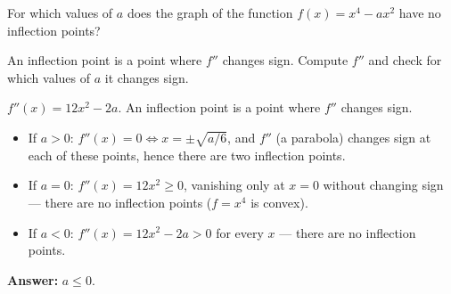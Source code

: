 
\begin{question}
For which values of $a$ does the graph of the function $f(x)=x^4-ax^2$ have no inflection points?
\end{question}

\begin{hint}
An inflection point is a point where $f''$ changes sign. Compute $f''$ and check for which values of $a$ it changes sign.
\end{hint}

\begin{solution}
$f''(x)=12x^2-2a$. An inflection point is a point where $f''$ changes sign.
\begin{itemize}
  \item If $a>0$: $f''(x)=0\iff x=\pm\sqrt{a/6}$, and $f''$ (a parabola) changes sign at each of these points, hence there are two inflection points.
  \item If $a=0$: $f''(x)=12x^2\ge0$, vanishing only at $x=0$ without changing sign — there are no inflection points ($f=x^4$ is convex).
  \item If $a<0$: $f''(x)=12x^2-2a>0$ for every $x$ — there are no inflection points.
\end{itemize}
\textbf{Answer:} $a\le0$.
\end{solution}
